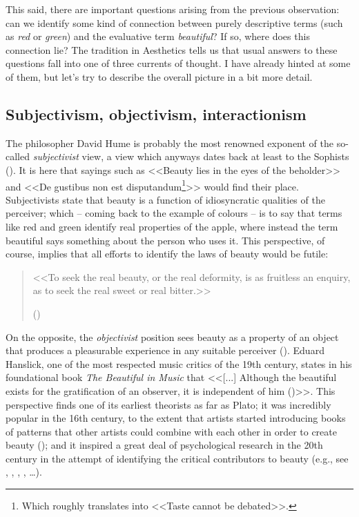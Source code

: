 This said, there are important questions arising from the previous observation: can we identify some kind of connection between purely descriptive terms (such as \emph{red} or \emph{green}) and the evaluative term \emph{beautiful}? If so, where does this connection lie? The tradition in Aesthetics tells us that usual answers to these questions fall into one of three currents of thought. I have already hinted at some of them, but let's try to describe the overall picture in a bit more detail.

\subsection{Subjectivism, objectivism, interactionism}\label{subsec:subj-obj-inter}
The philosopher David Hume is probably the most renowned exponent of the so-called \emph{subjectivist} view, a view which anyways dates back at least to the Sophists (\cite{tatarkiewicz2006history}). It is here that sayings such as <<Beauty lies in the eyes of the beholder>> and <<De gustibus non est disputandum\footnote{Which roughly translates into <<Taste cannot be debated>>.}>> would find their place. Subjectivists state that beauty is a function of idiosyncratic qualities of the perceiver; which -- coming back to the example of colours -- is to say that terms like red and green identify real properties of the apple, where instead the term beautiful says something about the person who uses it. This perspective, of course, implies that all efforts to identify the laws of beauty would be futile:
\begin{quote}
<<To seek the real beauty, or the real deformity, is as fruitless an enquiry, as to seek the real sweet or real bitter.>>

(\cite{hume1757standard})
\end{quote}

On the opposite, the \emph{objectivist} position sees beauty as a property of an object that produces a pleasurable experience in any suitable perceiver (\cite{tatarkiewicz2006history}). Eduard Hanslick, one of the most respected music critics of the 19th century, states in his foundational book \emph{The Beautiful in Music} that <<[...] Although the beautiful exists for the gratification of an observer, it is independent of him (\cite{hanslick1957beautiful})>>. This perspective finds one of its earliest theorists as far as Plato; it was incredibly popular in the 16th century, to the extent that artists started introducing books of patterns that other artists could combine with each other in order to create beauty (\cite{gombrich1995story}); and it inspired a great deal of psychological research in the 20th century in the attempt of identifying the critical contributors to beauty (e.g., see \cite{birkhoff1933aesthetic}, \cite{arnheim1974art}, \cite{gombrich1980sense}, \cite{gombrich1995story}, \ldots).

